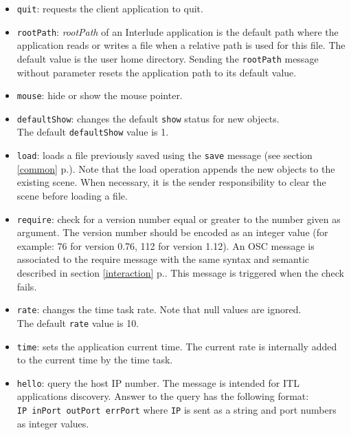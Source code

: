 \documentclass[a4paper,twoside]{report}
\newcommand{\fullref}[1]	{\ref{#1} p.\pageref{#1}}
\newcommand{\OSC}[1]		{\texttt{#1}}
\newcommand{\example}		{\hspace*{1cm}}
\begin{document}
\begin{itemize}
\item \OSC{quit}: requests the client application to quit.

\item \OSC{rootPath}: \emph{rootPath} of an Interlude application is the default path where the application reads or writes a file when a relative path is used for this file. The default value is the user home directory. Sending the \OSC{rootPath} message without parameter resets the application path to its default value.

\item \OSC{mouse}: hide or show the mouse pointer.

\item \OSC{defaultShow}: changes the default \OSC{show} status for new objects. \\
The default \OSC{defaultShow} value is 1.

\item \OSC{load}: loads a file previously saved using the \OSC{save} message (see section \fullref{common}). Note that the load operation appends the new objects to the existing scene. When necessary, it is the sender responsibility to clear the scene before loading a file.

\item \OSC{require}: check for a version number equal or greater to the number given as argument. The version number should be encoded as an integer value (for example: 76 for version 0.76, 112 for version 1.12). An OSC message is associated to the require message with the same syntax and semantic described in section \fullref{interaction}. This message is triggered when the check fails.

\item \OSC{rate}: changes the time task rate. Note that null values are ignored.\\
The default \OSC{rate} value is 10.

\item \OSC{time}: sets the application current time. The current rate is internally added to the current time by the time task.

\item \OSC{hello}: query the host IP number. The message is intended for ITL applications discovery. Answer to the query has the following format: \\
\example \OSC{IP  inPort outPort errPort} where \OSC{IP} is sent as a string and port numbers as integer values.

\end{itemize}
\end{document}
